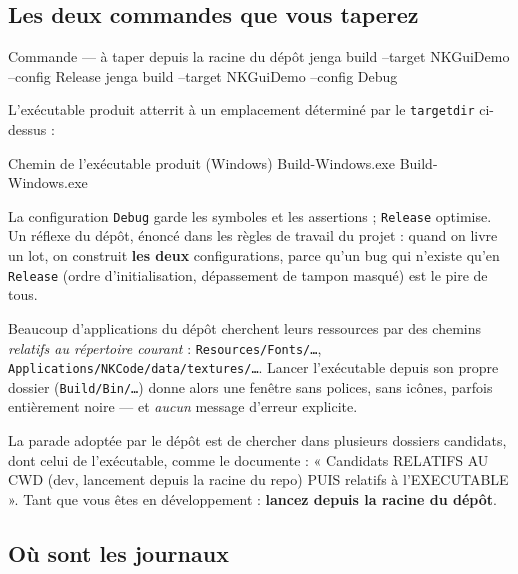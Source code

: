\subsection{Les deux commandes que vous taperez}

\begin{nkcode}{Commande — à taper depuis la racine du dépôt}
jenga build --target NKGuiDemo --config Release
jenga build --target NKGuiDemo --config Debug
\end{nkcode}

L'exécutable produit atterrit à un emplacement déterminé par le
\texttt{targetdir} ci-dessus :

\begin{nkcode}{Chemin de l'exécutable produit (Windows)}
Build\Bin\Release-Windows\NKGuiDemo\NKGuiDemo.exe
Build\Bin\Debug-Windows\NKGuiDemo\NKGuiDemo.exe
\end{nkcode}

La configuration \texttt{Debug} garde les symboles et les assertions ;
\texttt{Release} optimise. Un réflexe du dépôt, énoncé dans les règles de
travail du projet : quand on livre un lot, on construit \textbf{les deux}
configurations, parce qu'un bug qui n'existe qu'en \texttt{Release} (ordre
d'initialisation, dépassement de tampon masqué) est le pire de tous.

\begin{nkpiege}
Beaucoup d'applications du dépôt cherchent leurs ressources par des chemins
\emph{relatifs au répertoire courant} : \texttt{Resources/Fonts/\dots},
\texttt{Applications/NKCode/data/textures/\dots}. Lancer l'exécutable depuis son
propre dossier (\texttt{Build/Bin/\dots}) donne alors une fenêtre sans polices,
sans icônes, parfois entièrement noire — et \emph{aucun} message d'erreur
explicite.

La parade adoptée par le dépôt est de chercher dans plusieurs dossiers
candidats, dont celui de l'exécutable, comme le documente
 : « Candidats
RELATIFS AU CWD (dev, lancement depuis la racine du repo) PUIS relatifs à
l'EXECUTABLE ». Tant que vous êtes en développement : \textbf{lancez depuis la
racine du dépôt}.
\end{nkpiege}

\subsection{Où sont les journaux}

